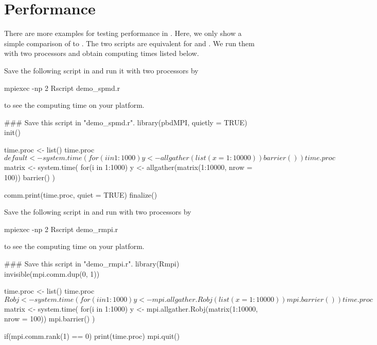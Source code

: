 
\section[Performance]{Performance}
\label{sec:performance}

There are more examples for testing performance in
. Here, we only show a simple
comparison of  to .  The two scripts are
equivalent for  and .  We run them with two
processors and obtain computing times listed below.

Save the following script in  and run it with two
processors by
\begin{Command}
mpiexec -np 2 Rscript demo_spmd.r
\end{Command}
to see the computing time on your platform.

\begin{Code}[title=\pkg{pbdMPI} R Script]
### Save this script in "demo_spmd.r".
library(pbdMPI, quietly = TRUE)
init()

time.proc <- list()
time.proc$default <- system.time({
  for(i in 1:1000) y <- allgather(list(x = 1:10000))
  barrier()
})

time.proc$matrix <- system.time({
  for(i in 1:1000) y <- allgather(matrix(1:10000, nrow = 100))
  barrier()
})

comm.print(time.proc, quiet = TRUE)
finalize()
\end{Code}

Save the following script in  and run with two processors by
\begin{Command}
mpiexec -np 2 Rscript demo_rmpi.r
\end{Command}
to see the computing time on your platform.

\begin{Code}[title=\pkg{Rmpi} R Script]
### Save this script in "demo_rmpi.r".
library(Rmpi)
invisible(mpi.comm.dup(0, 1))

time.proc <- list()
time.proc$Robj <- system.time({
  for(i in 1:1000) y <- mpi.allgather.Robj(list(x = 1:10000))
  mpi.barrier()
})

time.proc$matrix <- system.time({
  for(i in 1:1000) y <- mpi.allgather.Robj(matrix(1:10000, nrow = 100))
  mpi.barrier()
})

if(mpi.comm.rank(1) == 0) print(time.proc)
mpi.quit()
\end{Code}


